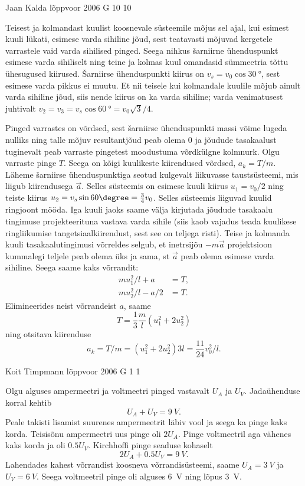 \documentclass[11pt]{article}
\begin{document}
{%
{Jaan Kalda} %
{lõppvoor} %
{2006} %
{G 10} %
{10} %
{

\ifSolution
Teisest ja kolmandast kuulist koosnevale süsteemile mõjus sel ajal, kui esimest kuuli lükati, esimese varda sihiline jõud, sest teatavasti mõjuvad kergetele varrastele vaid varda sihilised pinged. Seega nihkus šarniirne ühenduspunkt esimese varda sihiliselt ning teine ja kolmas kuul omandasid sümmeetria tõttu ühesugused kiirused. Šarniirse ühenduspunkti kiirus on $v_s = v_0 \cos \SI{30}{\degree}$, sest esimese varda pikkus ei muutu. Et nii teisele kui kolmandale kuulile mõjub ainult varda sihiline jõud, siis nende kiirus on ka varda sihiline; varda venimatusest juhtivalt $v_2 = v_3 = v_s \cos \SI{60}{\degree} = v_0 \sqrt 3/4$.

Pinged varrastes on võrdsed, sest šarniirse ühenduspunkti massi võime lugeda nulliks ning talle mõjuv resultantjõud peab olema 0 ja jõudude tasakaalust tuginevalt peab varraste pingetest moodustuma võrdkülgne kolmnurk. Olgu varraste pinge $T$. Seega on kõigi kuulikeste kiirendused võrdsed, $a_k = T /m$. Läheme šarniirse ühenduspunktiga seotud kulgevalt liikuvasse taustsüsteemi, mis liigub kiirendusega $\vec a$. Selles süsteemis on esimese kuuli kiirus $u_1 = v_0/2$ ning teiste kiirus $u_2 = v_s \sin 60\degree = \frac{3}{4} v_0$. Selles süsteemis liiguvad kuulid ringjoont mööda. Iga kuuli jaoks saame välja kirjutada jõudude tasakaalu tingimuse projekteerituna vastava varda sihile (siis kaob vajadus teada kuulikese ringliikumise tangetsiaalkiirendust, sest see on teljega risti). Teise ja kolmanda kuuli tasakaalutingimusi võrreldes selgub, et inetrsijõu $-m\vec a$ projektsioon kummalegi teljele peab olema üks ja sama, st $\vec a$ peab olema esimese varda sihiline. Seega saame kaks võrrandit:
\[
\begin{aligned}
mu_1^2/l + a &= T,\\
mu_2^2/l - a/2 &= T.
\end{aligned}
\]
Elimineerides neist võrrandeist $a$, saame
\[
T=\frac{1}{3} \frac{m}{l}\left(u_{1}^{2}+2 u_2^{2}\right)
\]
ning otsitava kiirenduse
\[
a_{k}=T / m=\left(u_{1}^{2}+2 u_2^{2}\right) 3 l=\frac{11}{24} v_{0}^{2} / l.
\]
\fi
}

{Koit Timpmann} %
{lõppvoor} %
{2006} %
{G 1} %
{1} %
{

\ifSolution
Olgu alguses ampermeetri ja voltmeetri pinged vastavalt $U_A$ ja $U_V$. Jadaühenduse korral kehtib
\[
U_A + U_V = \SI{9}{V}.
\]
Peale takisti lisamist suurenes ampermeetrit läbiv vool ja seega ka pinge kaks korda. Teisisõnu ampermeetri uus pinge oli $2U_A$. Pinge voltmeetril aga vähenes kaks korda ja oli $\num{0,5}U_V$. Kirchhoffi pinge seaduse kohaselt
\[
2U_A + \num{0,5}U_V = \SI{9}{V}.
\]
Lahendades kahest võrrandist koosneva võrrandisüsteemi, saame $U_A = \SI{3}{V}$ ja $U_V = \SI{6}{V}$. Seega voltmeetril pinge oli alguses \SI{6}{V} ning lõpus \SI{3}{V}.
\fi
}

}
\end{document}
